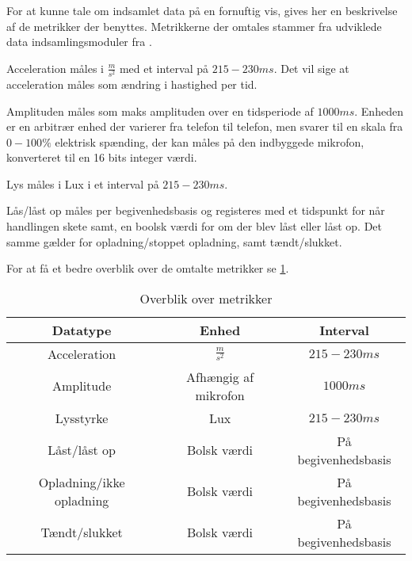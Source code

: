 For at kunne tale om indsamlet data på en fornuftig vis, gives her en beskrivelse af de metrikker der benyttes.
Metrikkerne der omtales stammer fra udviklede data indsamlingsmoduler fra \citet{misc:faellesrapp}.

Acceleration måles i $\frac{m}{s^2}$ med et interval på $215-230 ms$.
Det vil sige at acceleration måles som ændring i hastighed per tid.

Amplituden måles som maks amplituden over en tidsperiode af $1000ms$.
Enheden er en arbitrær enhed der varierer fra telefon til telefon, men svarer til en skala fra $0-100\%$ elektrisk spænding, der kan måles på den indbyggede mikrofon, konverteret til en 16 bits integer værdi.

Lys måles i Lux i et interval på $215-230 ms$.

Lås/låst op måles per begivenhedsbasis og registeres med et tidspunkt for når handlingen skete samt, en boolsk værdi for om der blev låst eller låst op.
Det samme gælder for opladning/stoppet opladning, samt tændt/slukket.

For at få et bedre overblik over de omtalte metrikker se \cref{tab:metrikker}.

\begin{table}[h]
\begin{tabular}{|c|c|c|}
	\hline Datatype & Enhed & Interval \\ 
	\hline Acceleration & $\frac{m}{s^2}$ & $215-230ms$ \\ 
	\hline Amplitude & Afhængig af mikrofon & $1000ms$ \\ 
	\hline Lysstyrke & Lux & $215-230ms$ \\ 
	\hline Låst/låst op & Bolsk værdi & På begivenhedsbasis \\ 
	\hline Opladning/ikke opladning & Bolsk værdi & På begivenhedsbasis \\ 
	\hline Tændt/slukket & Bolsk værdi & På begivenhedsbasis \\ 
	\hline 
\end{tabular}
\caption{Overblik over metrikker}\label{tab:metrikker} 
\end{table}